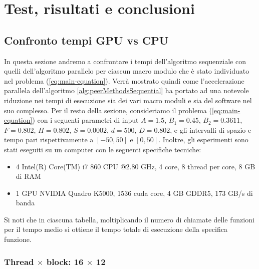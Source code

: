\def\baselinestretch{1}
\chapter{Test, risultati e conclusioni} \label{cap:test}
\def\baselinestretch{1.66}

\section{Confronto tempi GPU vs CPU} \label{sec:parallel_test}
\noindent In questa sezione andremo a confrontare i tempi dell'algoritmo sequenziale con quelli dell'algoritmo parallelo per ciascun macro modulo che è stato individuato nel problema (\ref{eq:main-equation}). Verrà mostrato quindi come l'accelerazione parallela dell'algoritmo \ref{alg:peerMethodsSequential} ha portato ad una notevole riduzione nei tempi di esecuzione sia dei vari macro moduli e sia del software nel suo complesso. Per il resto della sezione, consideriamo il problema (\ref{eq:main-equation}) con i seguenti parametri di input $A = 1.5$, $B_1 = 0.45$, $B_2 = 0.3611$, $F = 0.802$, $H = 0.802$, $S = 0.0002$, $d = 500$, $D = 0.802$, e gli intervalli di spazio e tempo pari rispettivamente a $\left[-50, 50\right]$ e $[0, 50]$. Inoltre, gli esperimenti sono stati eseguiti su un  computer con le seguenti specifiche tecniche:
\begin{itemize}
    \item 4 Intel(R) Core(TM) i7 860 CPU @2.80 GHz, 4 core, 8 thread per core, 8 GB di RAM
    \item 1 GPU NVIDIA Quadro K5000, 1536 cuda core, 4 GB GDDR5, 173 GB/s di banda
\end{itemize}

\noindent Si noti che in ciascuna tabella, moltiplicando il numero di chiamate delle funzioni per il tempo medio si ottiene il tempo totale di esecuzione della specifica funzione.

\newpage

\subsection{Thread $\times$ block: 16 $\times$ 12}

